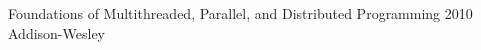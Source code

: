 
\begingroup
\begin{thebibliography}{99}

  {Foundations of Multithreaded, Parallel, and Distributed Programming}
  {2010}
  {Addison-Wesley}


\end{thebibliography}
\endgroup
